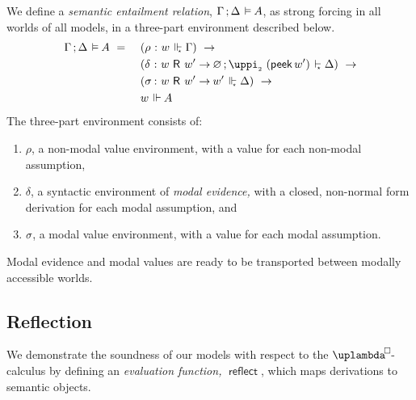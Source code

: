 \documentclass[submission,copyright,creativecommons,sharealike,backref=page]{eptcs}
\newcommand{\uplambdabox}{\uplambda^{\mkern-3mu\Box\mkern-3mu}}
\newcommand{\sigmas}{\rlap{$\sigma$}\hphantom{\delta}}
\newcommand{\sA}{\mkern-2muA}
\newcommand{\R}{\mathrel{\rlap{$\mkern.75mu\textsf{R}$}\hphantom{\subseteq}}}
\renewcommand{\:}{\mathop{\mkern3mu:\mkern3mu}}
\renewcommand{\.}{\mathop{\mkern3mu.\mkern3mu}}
\renewcommand{\;}{\mathop{;}}
\renewcommand{\,}{\mathop{,}}
\newcommand{\es}{\mathrel{\mkern2mu\vdash_{\mkern-9mu\scriptscriptstyle{\star}}}}
\newcommand{\ee}{\mathrel{\mkern2mu\Vdash\mkern1mu}}
\newcommand{\ees}{\mathrel{\mkern2mu\Vdash_{\mkern-9mu\scriptscriptstyle{\star}}}}
\newcommand{\ef}{\mathrel{\mkern2mu\vDash\mkern1mu}}
\renewcommand{\r}{\mathrel{\rightarrow\mkern-1mu}}
\newcommand{\reflect}{\operatorname{\textsf{reflect}}}
\newcommand{\peek}{\operatorname{\textsf{peek}}}
\newcommand{\piii}{\operatorname{\uppi_{\scriptscriptstyle{2}}}}
\renewcommand{\O}{\varnothing}
\theoremstyle{mystyle}
\begin{document}
We define a \emph{semantic entailment relation}, $\Gamma \; \Delta \ef \sA$, as strong forcing in all worlds of all models, in a three-part environment described below.
\begin{alignat*}{2}
  & \Gamma \; \Delta \ef \sA ~=~ && (\rho \: w \ees \Gamma) ~\r\\
  &                              && (\delta \: w \R w' \r \O \; \piii~(\peek w') \es \Delta) ~\r\\
  &                              && (\sigmas \: w \R w' \r w' \ees \Delta) ~\r\\
  &                              && w \ee \sA
\end{alignat*}
The three-part environment consists of:
\begin{enumerate}
  \item $\rho$, a non-modal value environment, with a value for each non-modal assumption,
  \item $\delta$, a syntactic environment of \emph{modal evidence,} with a closed, non-normal form derivation for each modal assumption, and
  \item $\sigma\mkern-2mu$, a modal value environment, with a value for each modal assumption.
\end{enumerate}
Modal evidence and modal values are ready to be transported between modally accessible worlds.


\subsection{Reflection}

We demonstrate the soundness of our models with respect to the $\uplambdabox$-calculus by defining an \emph{evaluation function,} $\reflect$, which maps derivations to semantic objects.
\end{document}
